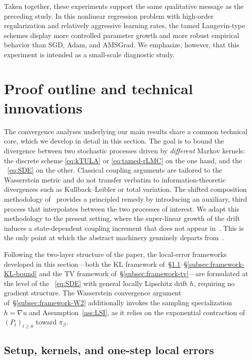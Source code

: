 \documentclass[11pt,a4paper,reqno]{amsart}
\theoremstyle{plain}
\theoremstyle{definition}
\theoremstyle{remark}
\begin{document}
Taken together, these experiments support the same qualitative message as the preceding study. In this nonlinear regression problem with high-order regularization and relatively aggressive learning rates, the tamed Langevin-type schemes display more controlled parameter growth and more robust empirical behavior than SGD, Adam, and AMSGrad. We emphasize, however, that this experiment is intended as a small-scale diagnostic study.

\section{Proof outline and technical innovations}
\label{sec:framework}

The convergence analyses underlying our main results share a common
technical core, which we develop in detail in this section. The goal is
to bound the divergence between two stochastic processes driven by
\emph{different} Markov kernels: the discrete scheme \ref{eq:kTULA} or
\ref{eq:tamed-rLMC} on the one hand, and the ~\eqref{eq:SDE} on the other. Classical coupling arguments are
tailored to the Wasserstein metric and do not transfer verbatim to
information-theoretic divergences such as Kullback--Leibler or
total variation. The shifted composition methodology of~\cite{chewi2024local} provides a principled remedy by
introducing an auxiliary, third process that interpolates between the
two processes of interest. We adapt this methodology to the present
setting, where the super-linear growth of the drift induces a
state-dependent coupling increment that does not appear
in~\cite{chewi2024local}. This is the only point at which the abstract
machinery genuinely departs from~\cite{chewi2024local}.

\medskip
Following the two-layer structure of the paper, the local-error frameworks developed in this section---both the KL framework of~\S\ref{subsec:framework-setup}--\S\ref{subsec:framework-KL-bound} and the TV framework of~\S\ref{subsec:framework-tv}---are formulated at the level of the ~\eqref{eq:SDE} with general locally Lipschitz drift $h$, requiring no gradient structure. The Wasserstein convergence argument of~\S\ref{subsec:framework-W2} additionally invokes the sampling specialization $h=\nabla u$ and Assumption~\ref{ass:LSI}, as it relies on the exponential contraction of $(P_t)_{t\ge 0}$ toward $\pi_\beta$.

\subsection{Setup, kernels, and one-step local errors}
\label{subsec:framework-setup}
\end{document}
